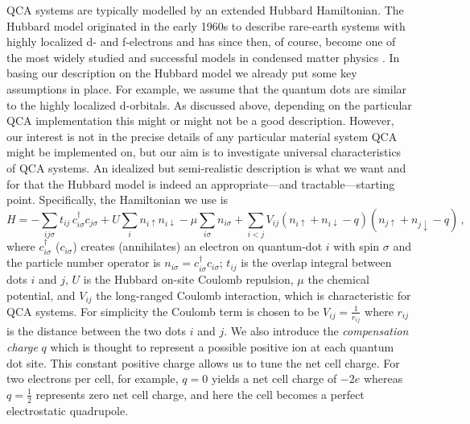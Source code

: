 QCA systems are typically modelled by an extended Hubbard Hamiltonian. The
Hubbard model originated in the early 1960s to describe rare-earth systems with
highly localized d- and f-electrons and has since then, of course, become one of
the most widely studied and successful models in condensed matter physics
\cite{Hubbard1964}. In basing our description on the Hubbard model we already
put some key assumptions in place. For example, we assume that the quantum dots
are similar to the highly localized d-orbitals. As discussed above, depending on
the particular QCA implementation this might or might not be a good description.
However, our interest is not in the precise details of any particular material
system QCA might be implemented on, but our aim is to investigate universal
characteristics of QCA systems. An idealized but semi-realistic description is
what we want and for that the Hubbard model is indeed an appropriate---and
tractable---starting point. Specifically, the Hamiltonian we use is
\begin{equation}
  \label{eq:H_QCA}
  H =
    - \sum_{ij\sigma} t_{ij} \, c^{\dagger}_{i\sigma} c_{j\sigma}
    + U \sum_i n_{i\uparrow} n_{i\downarrow}
    - \mu \sum_{i\sigma} n_{i\sigma}
    + \sum_{i<j} V_{ij} \left( n_{i\uparrow} + n_{i\downarrow} - q \right) 
                        \left( n_{j\uparrow} + n_{j\downarrow} - q \right) \, ,
\end{equation}
where $c^{\dagger}_{i\sigma}$ ($c_{i\sigma}$) creates (annihilates) an electron
on quantum-dot $i$ with spin $\sigma$ and the particle number operator is
$n_{i\sigma} = c^{\dagger}_{i\sigma} c_{i\sigma}$; $t_{ij}$ is the overlap integral between
dots $i$ and $j$, $U$ is the Hubbard on-site Coulomb repulsion, $\mu$ the
chemical potential, and $V_{ij}$ the long-ranged Coulomb interaction, which is
characteristic for QCA systems. For simplicity the Coulomb term is chosen to be
$V_{ij} = \frac{1}{r_{ij}}$ where $r_{ij}$ is the distance between the two dots
$i$ and $j$. We also introduce the \emph{compensation charge} $q$ which is
thought to represent a possible positive ion at each quantum dot site. This
constant positive charge allows us to tune the net cell charge. For two
electrons per cell, for example, $q=0$ yields a net cell charge of $-2e$ whereas
$q = \frac{1}{2}$ represents zero net cell charge, and here the cell becomes a
perfect electrostatic quadrupole.

